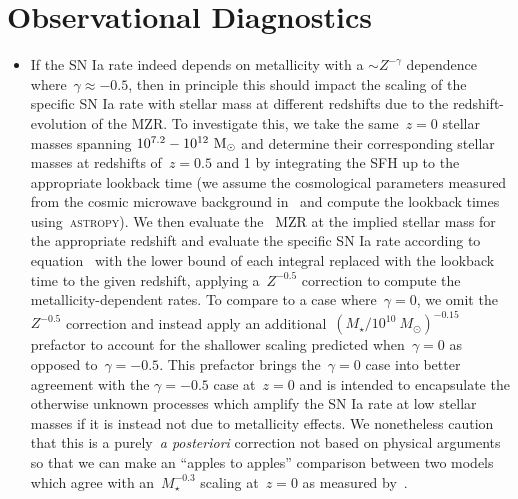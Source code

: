 \documentclass[ms.tex]{subfiles}
\begin{document}
\section{Observational Diagnostics}
\label{sec:diagnostics}

\begin{itemize}

	\item If the SN Ia rate indeed depends on metallicity with a
	$\sim Z^{-\gamma}$ dependence where~$\gamma \approx -0.5$, then in principle
	this should impact the scaling of the specific SN Ia rate with stellar mass
	at different redshifts due to the redshift-evolution of the MZR.
	To investigate this, we take the same~$z = 0$ stellar masses spanning
	$10^{7.2} - 10^{12}~\text{M}_\odot$ and determine their corresponding stellar masses
	at redshifts of~$z = 0.5$ and 1 by integrating the SFH up to the
	appropriate lookback time (we assume the cosmological parameters measured
	from the cosmic microwave background in~\citealt{Planck2014} and compute
	the lookback times using~\textsc{astropy}).
	We then evaluate the~\citet{Zahid2014} MZR at the implied stellar mass for
	the appropriate redshift and evaluate the specific SN Ia rate according to
	equation~ with the lower bound of each integral replaced
	with the lookback time to the given redshift, applying a~$Z^{-0.5}$
	correction to compute the metallicity-dependent rates.
	To compare to a case where~$\gamma = 0$, we omit the~$Z^{-0.5}$ correction
	and instead apply an additional~$(M_\star / 10^{10}~M_\odot)^{-0.15}$
	prefactor to account for the shallower scaling predicted when~$\gamma = 0$
	as opposed to~$\gamma = -0.5$.
	This prefactor brings the~$\gamma = 0$ case into better agreement with the
	$\gamma = -0.5$ case at~$z = 0$ and is intended to encapsulate the
	otherwise unknown processes which amplify the SN Ia rate at low stellar
	masses if it is instead not due to metallicity effects.
	We nonetheless caution that this is a purely~\textit{a posteriori}
	correction not based on physical arguments so that we can make an
	``apples to apples'' comparison between two models which agree with
	an~$M_\star^{-0.3}$ scaling at~$z = 0$ as measured by~\citet{Gandhi2022}.


\end{itemize}
\end{document}

